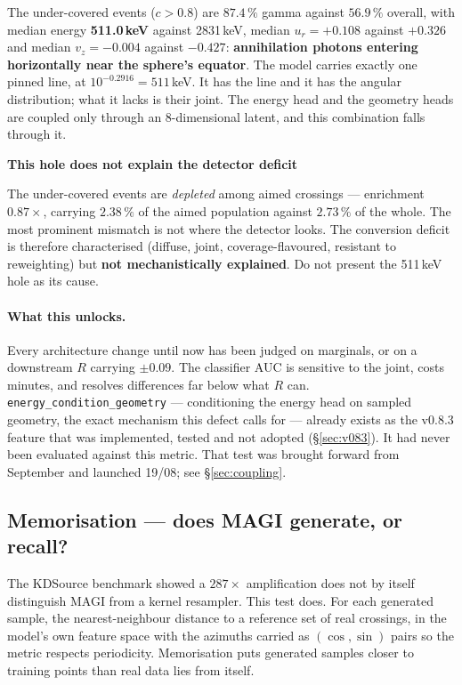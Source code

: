 \documentclass[11pt,a4paper]{article}
\newenvironment{callout}[3]%
{\par\medskip\noindent
 \def\calloutframe{#1}\def\calloutback{#2}%
 \setlength{\fboxrule}{0.9pt}\setlength{\fboxsep}{8pt}%
 \begin{lrbox}{\calloutbox}%
 \begin{minipage}{\dimexpr\textwidth-2\fboxsep-2\fboxrule\relax}%
 \setlength{\parskip}{4pt}%
 \textcolor{#1}{\textbf{#3}}\par\nobreak\smallskip}
{\end{minipage}\end{lrbox}%
 \fcolorbox{\calloutframe}{\calloutback}{\usebox{\calloutbox}}%
 \par\medskip}
\begin{document}
The under-covered events ($c>0.8$) are $87.4\,\%$ gamma against $56.9\,\%$
overall, with median energy \textbf{511.0\,keV} against 2831\,keV, median
$u_r = +0.108$ against $+0.326$ and median $v_z = -0.004$ against $-0.427$:
\textbf{annihilation photons entering horizontally near the sphere's equator}.
The model carries exactly one pinned line, at $10^{-0.2916} = 511$\,keV. It has
the line and it has the angular distribution; what it lacks is their joint. The
energy head and the geometry heads are coupled only through an 8-dimensional
latent, and this combination falls through it.

\begin{callout}{warn}{red!4}{This hole does not explain the detector deficit}
The under-covered events are \emph{depleted} among aimed crossings --- enrichment
$0.87\times$, carrying $2.38\,\%$ of the aimed population against $2.73\,\%$ of
the whole. The most prominent mismatch is not where the detector looks. The
conversion deficit is therefore characterised (diffuse, joint, coverage-flavoured,
resistant to reweighting) but \textbf{not mechanistically explained}. Do not
present the 511\,keV hole as its cause.
\end{callout}

\paragraph{What this unlocks.} Every architecture change until now has been judged
on marginals, or on a downstream $R$ carrying $\pm0.09$. The classifier AUC is
sensitive to the joint, costs minutes, and resolves differences far below what
$R$ can. \texttt{energy\_condition\_geometry} --- conditioning the energy head on
sampled geometry, the exact mechanism this defect calls for --- already exists as
the v0.8.3 feature that was implemented, tested and not adopted
(\S\ref{sec:v083}). It had never been evaluated against this metric. That test
was brought forward from September and launched 19/08; see \S\ref{sec:coupling}.

\subsection{Memorisation --- does MAGI generate, or recall?}
\label{sec:memorisation}

The KDSource benchmark showed a $287\times$ amplification does not by itself
distinguish MAGI from a kernel resampler. This test does. For each generated
sample, the nearest-neighbour distance to a reference set of real crossings, in
the model's own feature space with the azimuths carried as $(\cos,\sin)$ pairs so
the metric respects periodicity. Memorisation puts generated samples closer to
training points than real data lies from itself.
\end{document}
